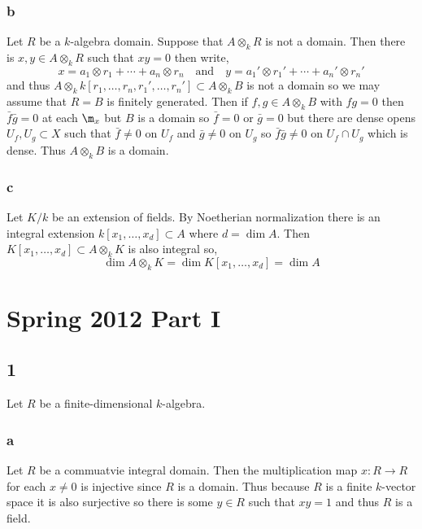 \documentclass[12pt]{article}
\begin{document}
\subsubsection{b}

Let $R$ be a $k$-algebra domain. Suppose that $A \otimes_k R$ is not a domain. Then there is $x, y \in A \otimes_k R$ such that $xy = 0$ then write,
\[ x = a_1 \otimes r_1 + \cdots + a_n \otimes r_n \quad \text{and} \quad y = a_1' \otimes r_1' + \cdots + a_n' \otimes r_n' \]
and thus $A \otimes_k k[r_1, \dots, r_n, r_1', \dots, r_n'] \subset A \otimes_k B$ is not a domain so we may assume that $R = B$ is finitely generated. Then if $f, g \in A \otimes_k B$ with $fg = 0$ then $\bar{f} \bar{g} = 0$ at each $\m_x$ but $B$ is a domain so $\bar{f} = 0$ or $\bar{g} = 0$ but there are dense opens $U_f, U_g \subset X$ such that $\bar{f} \neq 0$ on $U_f$ and $\bar{g} \neq 0$ on $U_g$ so $\bar{f} \bar{g} \neq 0$ on $U_f \cap U_g$ which is dense. Thus $A \otimes_k B$ is a domain. 

\subsubsection{c}

Let $K / k$ be an extension of fields. By Noetherian normalization there is an integral extension $k[x_1, \dots, x_d] \subset A$ where $d = \dim{A}$. Then $K[x_1, \dots, x_d] \subset A \otimes_k K$ is also integral so,
\[ \dim{A \otimes_k K} = \dim{K[x_1, \dots, x_d]} = \dim{A} \]

\section{Spring 2012 Part I}

\subsection{1}

Let $R$ be a finite-dimensional $k$-algebra.

\subsubsection{a}

Let $R$ be a commuatvie integral domain. Then the multiplication map $x : R \to R$ for each $x \neq 0$ is injective since $R$ is a domain. Thus because $R$ is a finite $k$-vector space it is also surjective so there is some $y \in R$ such that $xy = 1$ and thus $R$ is a field.
\end{document}
